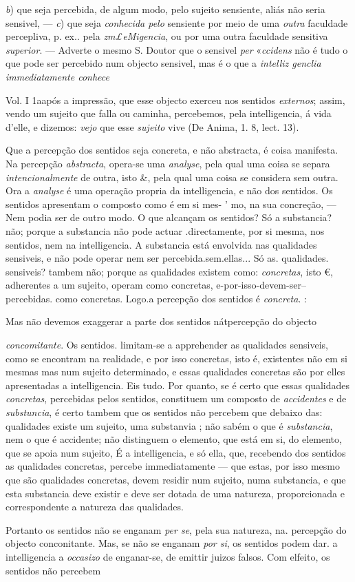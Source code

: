 \emph{b}) que seja percebida, de algum modo, pelo sujeito sensiente, aliás não seria sensivel, --- \emph{c}) que seja \emph{conhecida pelo} sensiente por meio de uma \emph{outra} faculdade percepliva, p. ex.. pela \emph{zm£eMigencia}, ou por uma outra faculdade sensitiva \emph{superior}. --- Adverte o mesmo S. Doutor que o sensivel \emph{per} «\emph{ccidens} não é tudo o que pode ser percebido num objecto sensivel, mas é o que a \emph{intelliz genclia immediatamente conhece}\par Vol. I 1aapós a impressão, que esse objecto exerceu nos sentidos \emph{externos}; assim, vendo um sujeito que falla ou caminha, percebemos, pela intelligencia, á vida d'elle, e dizemos: \emph{vejo} que esse \emph{sujeito} vive (De Anima, 1. 8, lect. 13).\par Que a percepção dos sentidos seja concreta, e não abstracta, é coisa manifesta. Na percepção \emph{abstracta}, opera-se uma \emph{analyse}, pela qual uma coisa se separa \emph{intencionalmente} de outra, isto \&, pela qual uma coisa se considera sem outra. Ora a \emph{analyse} é uma operação propria da intelligencia, e não dos sentidos. Os sentidos apresentam o composto como é em si mes- ' mo, na sua concreção, --- Nem podia ser de outro modo. O que alcançam os sentidos? Só a substancia? não; porque a substancia não pode actuar .directamente, por si mesma, nos sentidos, nem na intelligencia. A substancia está envolvida nas qualidades sensiveis, e não pode operar nem ser percebida.sem.ellas... Só as. qualidades. sensiveis? tambem não; porque as qualidades existem como: \emph{concretas}, isto €, adherentes a um sujeito, operam como concretas, e-por-isso-devem-ser-- percebidas. como concretas. Logo.a percepção dos sentidos é \emph{concreta}. :\par Mas não devemos exaggerar a parte dos sentidos nátpercepção do objecto\par \emph{concomitante}. Os sentidos. limitam-se a apprehender as qualidades sensiveis, como se encontram na realidade, e por isso concretas, isto é, existentes não em si mesmas mas num sujeito determinado, e essas qualidades concretas são por elles apresentadas a intelligencia. Eis tudo. Por quanto, se é certo que essas qualidades \emph{concretas}, percebidas pelos sentidos, constituem um composto de \emph{accidentes} e de \emph{substuncia}, é certo tambem que os sentidos não percebem que debaixo das: qualidades existe um sujeito, uma substanvia ; não sabém o que é \emph{substancia}, nem o que é accidente; não distinguem o elemento, que está em si, do elemento, que se apoia num sujeito, É a intelligencia, e só ella, que, recebendo dos sentidos as qualidades concretas, percebe immediatamente --- que estas, por isso mesmo que são qualidades concretas, devem residir num sujeito, numa substancia, e que esta substancia deve existir e deve ser dotada de uma natureza, proporcionada e correspondente a natureza das qualidades.\par Portanto os sentidos não se enganam \emph{per se}, pela sua natureza, na. percepção do objecto conconitante. Mas, se não se enganam \emph{por si}, os sentidos podem dar. a intelligencia a \emph{occasizo} de enganar-se, de emittir juizos falsos. Com elfeito, os sentidos não percebem 